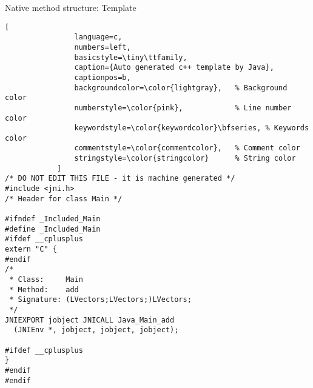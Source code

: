 \begin{frame}[fragile]{Native method structure: Template}
    \begin{center}
        \begin{minipage}{0.8\textwidth} %
            \begin{lstlisting}[
                language=c,
                numbers=left,
                basicstyle=\tiny\ttfamily,
                caption={Auto generated c++ template by Java},
                captionpos=b,
                backgroundcolor=\color{lightgray},   % Background color
                numberstyle=\color{pink},            % Line number color
                keywordstyle=\color{keywordcolor}\bfseries, % Keywords color
                commentstyle=\color{commentcolor},   % Comment color
                stringstyle=\color{stringcolor}      % String color
            ]
/* DO NOT EDIT THIS FILE - it is machine generated */
#include <jni.h>
/* Header for class Main */

#ifndef _Included_Main
#define _Included_Main
#ifdef __cplusplus
extern "C" {
#endif
/*
 * Class:     Main
 * Method:    add
 * Signature: (LVectors;LVectors;)LVectors;
 */
JNIEXPORT jobject JNICALL Java_Main_add
  (JNIEnv *, jobject, jobject, jobject);

#ifdef __cplusplus
}
#endif
#endif
            \end{lstlisting}
        \end{minipage}
    \end{center}
\end{frame}

